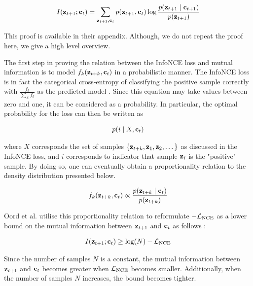 	\begin{equation} %
		I(\ztone; \ct) = \sum_{\ztone, \ct} p(\ztone, \ct) \log \frac{p(\ztone \mid \ctone)}{p(\ztone)}
	\end{equation}
	
	This proof is available in their appendix. Although, we do not repeat the proof here, we give a high level overview.
	
	The first step in proving the relation between the InfoNCE loss and mutual information is to model $f_k(\mathbf{z}_{t+k}, \mathbf{c}_t)$ in a probabilistic manner. The InfoNCE loss is in fact the categorical cross-entropy of classifying the positive sample correctly with $\frac{f_k}{\sum_{X} f_k}$ as the predicted model \cite{oordRepresentationLearningContrastive2019}. Since this equation may take values between zero and one, it can be considered as a probability. In particular, the optimal probability for the loss can then be written as 

	$$p(i \mid X, \mathbf{c}_t)$$
	
	where $X$ corresponds the set of samples  ${ \left\{ \mathbf{z}_{t+k}, \mathbf{z}_1, \mathbf{z}_2, \dots \right\} }$  as discussed in the InfoNCE loss, and $i$ corresponds to indicator that sample $\mathbf{z}_i$ is the "positive" sample. By doing so, one can eventually obtain a proportionality relation to the density distribution presented below. 
	
	\begin{equation}
		f_k(\mathbf{z}_{t+k}, \mathbf{c}_t) \propto \frac{p(\mathbf{z}_{t+k} \mid \mathbf{c}_t)}{p(\mathbf{z}_{t+k})} \label{eq:fkproporational}
	\end{equation}
	
	Oord et al. utilise this proportionality relation to reformulate $-\mathcal{L}_{\text{NCE}}$ as a lower bound on the mutual information between $\mathbf{z}_{t+1}$ and $\mathbf{c}_t$ as follows \cite{lowePuttingEndEndtoEnd2020, oordRepresentationLearningContrastive2019}:
	
	\begin{equation}
		I(\mathbf{z}_{t+1}; \mathbf{c}_t) \ge \log(N) - \mathcal{L}_{\text{NCE}}
	\end{equation}

	Since the number of samples $N$ is a constant, the mutual information between $\mathbf{z}_{t+1}$ and $\mathbf{c}_t$ becomes greater when $\mathcal{L}_{\text{NCE}}$ becomes smaller. Additionally, when the number of samples $N$ increases, the bound becomes tighter.
	
